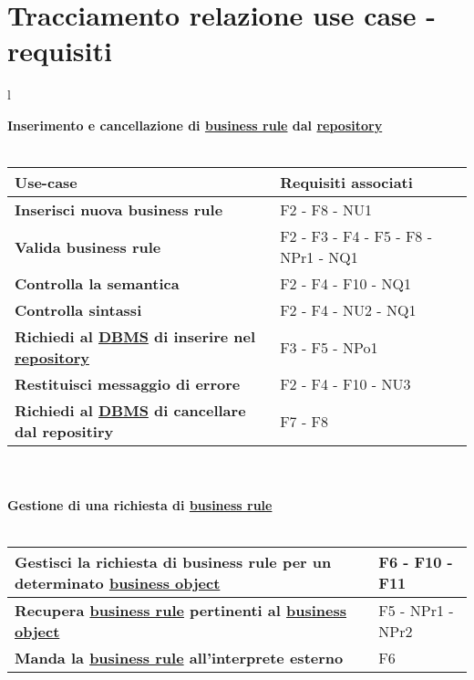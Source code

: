 \section{Tracciamento relazione use case - requisiti}
\large{
\begin{tabular}{l}

\textbf{Inserimento e cancellazione di \underline{business rule} dal \underline{repository}}\\ \\

\begin{tabular}{||p{8cm}||p{4cm}||} \hline
\textbf{Use-case} & \textbf{Requisiti associati} \\ \hline
\textbf{Inserisci nuova business rule} & F2 - F8 - NU1 \\ \hline
\textbf{Valida business rule} & F2 - F3 - F4 - F5 - F8 - NPr1 - NQ1 \\ \hline
\textbf{Controlla la semantica} & F2 - F4 - F10 - NQ1\\ \hline
\textbf{Controlla sintassi} & F2 - F4 - NU2 - NQ1\\ \hline
\textbf{Richiedi al \underline{DBMS} di inserire nel \underline{repository}} & F3 -  F5 -  NPo1 \\ \hline
\textbf{Restituisci messaggio di errore} & F2 - F4 - F10 - NU3 \\ \hline
\textbf{Richiedi al \underline{DBMS} di cancellare dal repositiry} & F7 - F8 \\ \hline
\end{tabular} \\ \\

\textbf {Gestione di una richiesta di \underline{business rule}}\\ \\

\begin{tabular}{||p{8cm}||p{4cm}||} \hline
\textbf{Gestisci la richiesta di business rule per un determinato \underline{business object}} & F6 - F10 - F11 \\ \hline
\textbf{Recupera \underline{business rule} pertinenti al \underline{business object}} & F5 - NPr1 - NPr2 \\ \hline
\textbf{Manda la \underline{business rule} all'interprete esterno} & F6 \\ \hline
\end{tabular} \\
\end{tabular}
}

